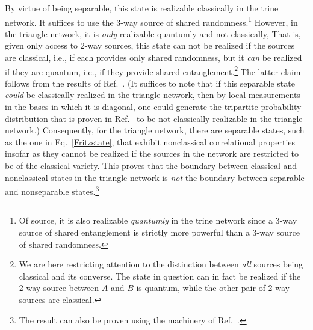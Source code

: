 \documentclass[12pt]{article}
\theoremstyle{plain}
\theoremstyle{definition}
\begin{document}
\begin{appendices}
By virtue of being separable, this state is realizable classically in the trine network.
 It suffices to use the 3-way source of shared randomness.\footnote{Of source, it is also realizable {\em quantumly} in the 
 trine network since a 3-way source of shared entanglement is strictly more powerful than a 3-way source of shared randomness.} 
 However, in the triangle network, it is {\em only} realizable quantumly and not classically,  That is, given only access to 2-way sources, this state can not be realized if the sources are classical, i.e., if each provides only shared randomness, but it {\em can} be realized if they are quantum, i.e., if they provide shared entanglement.\footnote{We are here restricting attention to the distinction between {\em all} sources being classical and its converse.
The state in question can in fact be realized if the 2-way source between $A$ and $B$ is quantum, while the other pair of 2-way sources are classical. 
}
   The latter claim follows from the results of Ref.~\cite{Fritz2012beyondBell}.  
(It suffices to note that if this separable state {\em could} be classically realized in the triangle network, then by local measurements in the bases in which it is diagonal, one could generate the tripartite probability distribution that is proven in Ref.~\cite{Fritz2012beyondBell} to be not classically realizable in the triangle network.) 
Consequently, for the triangle network, there are separable states, such as the one in Eq.~\eqref{Fritzstate}, that exhibit nonclassical correlational properties insofar as they cannot be realized if the sources in the network are restricted to be of the classical variety.  This proves that the boundary between classical and nonclassical states in the triangle network is {\em not} the boundary between separable and nonseparable states.\footnote{The result can also be proven using the machinery of Ref.~\cite{navascues2020genuine}.}





\end{appendices}
\end{document}
